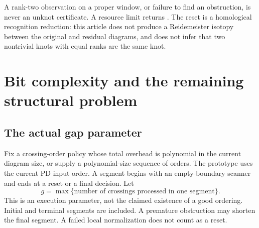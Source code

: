\documentclass[11pt]{article}
\theoremstyle{definition}\newtheorem{definition}[theorem]{Definition}\newtheorem{example}[theorem]{Example}
\theoremstyle{remark}\newtheorem{remark}[theorem]{Remark}
\newcommand{\code}[1]{\texttt{\detokenize{#1}}}
\begin{document}
A rank-two observation on a proper window, or failure to find an obstruction, is never an unknot certificate. A resource limit returns \code{UNKNOWN}. The reset is a homological recognition reduction: this article does not produce a Reidemeister isotopy between the original and residual diagrams, and does not infer that two nontrivial knots with equal ranks are the same knot.

\section{Bit complexity and the remaining structural problem}
\subsection{The actual gap parameter}
Fix a crossing-order policy whose total overhead is polynomial in the current diagram size, or supply a polynomial-size sequence of orders. The prototype uses the current PD input order. A segment begins with an empty-boundary scanner and ends at a reset or a final decision. Let
\[
 g=\max\{\text{number of crossings processed in one segment}\}.
\]
This is an execution parameter, not the claimed existence of a good ordering. Initial and terminal segments are included. A premature obstruction may shorten the final segment. A failed local normalization does not count as a reset.
\end{document}
